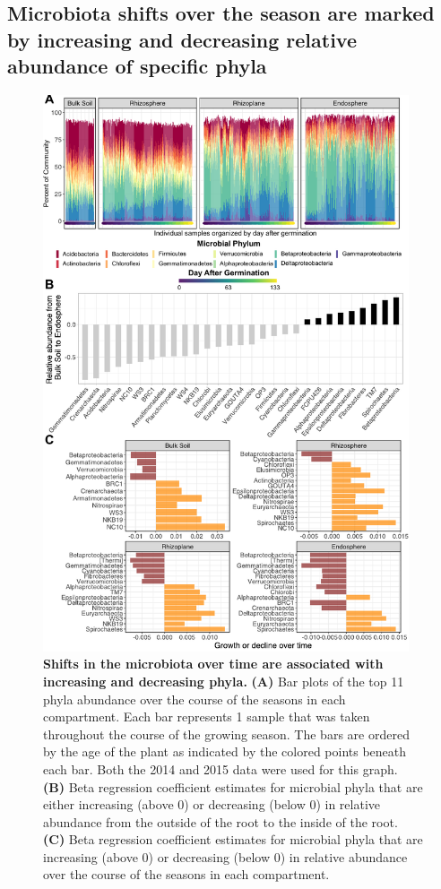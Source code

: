 \subsection{Microbiota shifts over the season are marked by increasing and decreasing relative abundance of specific phyla}
\begin{figure}[h]
\centering
\includegraphics[width=4.25in]{Figures/figure3_2}
\caption[Figure 4.2]{\textbf{Shifts in the microbiota over time are associated with increasing and decreasing phyla.} \textbf{(A)} Bar plots of the top 11 phyla abundance over the course of the seasons in each compartment. Each bar represents 1 sample that was taken throughout the course of the growing season. The bars are ordered by the age of the plant as indicated by the colored points beneath each bar. Both the 2014 and 2015 data were used for this graph. \textbf{(B)} Beta regression coefficient estimates for microbial phyla that are either increasing (above 0) or decreasing (below 0) in relative abundance from the outside of the root to the inside of the root. \textbf{(C)} Beta regression coefficient estimates for microbial phyla that are increasing (above 0) or decreasing (below 0) in relative abundance over the course of the seasons in each compartment.}
\label{Figure 4.2}
\end{figure}


